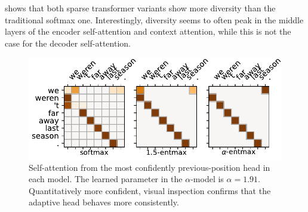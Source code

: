  shows that both sparse transformer variants show
more diversity than the traditional softmax one. Interestingly,
diversity seems to often peak in the middle layers of the encoder
self-attention and context attention, while this is not the case for
the decoder self-attention.

\begin{figure}[htbp]
    \centering
    \includegraphics[width=0.95\columnwidth]{Figures/head_prev.pdf}
    \caption[Self-attention from the most confidently previous-position head in
        each model.]{
        Self-attention from the most confidently previous-position head in
        each model. The learned parameter in the $\alpha$-\entmaxtext model
        is $\alpha=1.91$. Quantitatively more confident, visual inspection
        confirms that the adaptive head behaves more consistently.}
    \label{fig:head_prev}
\end{figure}

